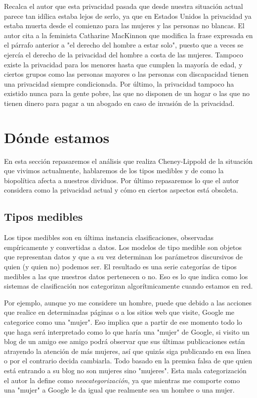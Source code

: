 \documentclass[11pt]{article}
\begin{document}
Recalca el autor que esta privacidad pasada que desde nuestra situación actual parece tan idílica estaba lejos de serlo, ya que en Estados Unidos la privacidad ya estaba muerta desde el comienzo para las mujeres y las personas no blancas. El autor cita a la feminista Catharine MacKinnon que modifica la frase expresada en el párrafo anterior a "el derecho del hombre a estar solo", puesto que a veces se ejercía el derecho de la privacidad del hombre a costa de las mujeres. Tampoco existe la privacidad para los menores hasta que cumplen la mayoría de edad, y ciertos grupos como las personas mayores o las personas con discapacidad tienen una privacidad siempre condicionada. Por último, la privacidad tampoco ha existido nunca para la gente pobre, las que no disponen de un hogar o las que no tienen dinero para pagar a un abogado en caso de invasión de la privacidad.
\section{Dónde estamos}
En esta sección repasaremos el análisis que realiza Cheney-Lippold de la situación que vivimos actualmente, hablaremos de los tipos medibles y de como la biopolítica afecta a nuestros dividuos. Por último repasaremos lo que el autor considera como la privacidad actual y cómo en ciertos aspectos está obsoleta.
\subsection{Tipos medibles}
Los tipos medibles son en última instancia clasificaciones, observadas empíricamente y convertidas a datos. Los modelos de tipo medible son objetos que representan datos y que a su vez determinan los parámetros discursivos de quien (y quien no) podemos ser. El resultado es una serie categorías de tipos medibles a las que nuestros datos pertenecen o no. Eso es lo que indica como los sistemas de clasificación nos categorizan algorítmicamente cuando estamos en red.

Por ejemplo, aunque yo me considere un hombre, puede que debido a las acciones que realice en determinadas páginas o a los sitios web que visite, Google me categorice como una "mujer". Eso implica que a partir de ese momento todo lo que haga será interpretado como lo que haría una "mujer" de Google, si visito un blog de un amigo ese amigo podrá observar que sus últimas publicaciones están atrayendo la atención de más mujeres, así que quizás siga publicando en esa línea o por el contrario decida cambiarla. Todo basado en la premisa falsa de que quien está entrando a su blog no son mujeres sino "mujeres". Esta mala categorización el autor la define como \textit{neocategorización}, ya que mientras me comporte como una "mujer" a Google le da igual que realmente sea un hombre o una mujer.
\end{document}
